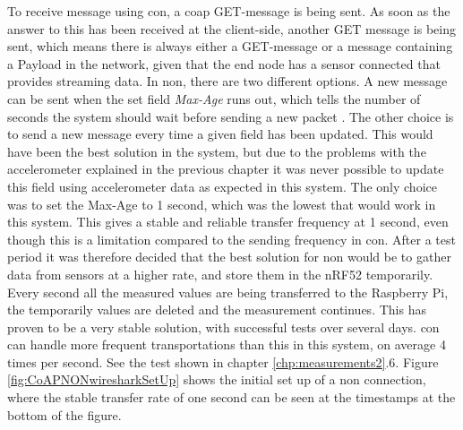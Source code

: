 To receive message using \gls{con}, a \gls{coap} GET-message is being sent. As soon as the answer to this has been received at the client-side, another GET message is being sent, which means there is always either a GET-message or a message containing a Payload in the network, given that the end node has a sensor connected that provides streaming data. In \gls{non}, there are two different options. A new message can be sent when the set field \textit{Max-Age} runs out, which tells the number of seconds the system should wait before sending a new packet \cite{shelby2014constrained}. The other choice is to send a new message every time a given field has been updated. This would have been the best solution in the system, but due to the problems with the accelerometer explained in the previous chapter it was never possible to update this field using accelerometer data as expected in this system. The only choice was to set the Max-Age to 1 second, which was the lowest that would work in this system. This gives a stable and reliable transfer frequency at 1 second, even though this is a limitation compared to the sending frequency in \gls{con}. After a test period it was therefore decided that the best solution for \gls{non} would be to gather data from sensors at a higher rate, and store them in the nRF52 temporarily. Every second all the measured values are being transferred to the Raspberry Pi, the temporarily values are deleted and the measurement continues. This has proven to be a very stable solution, with successful tests over several days. \gls{con} can handle more frequent transportations than this in this system, on average 4 times per second. See the test shown in chapter \ref{chp:measurements2}.6. Figure  \ref{fig:CoAPNONwiresharkSetUp} shows the initial set up of a \gls{non} connection, where the stable transfer rate of one second can be seen at the timestamps at the bottom of the figure. 




